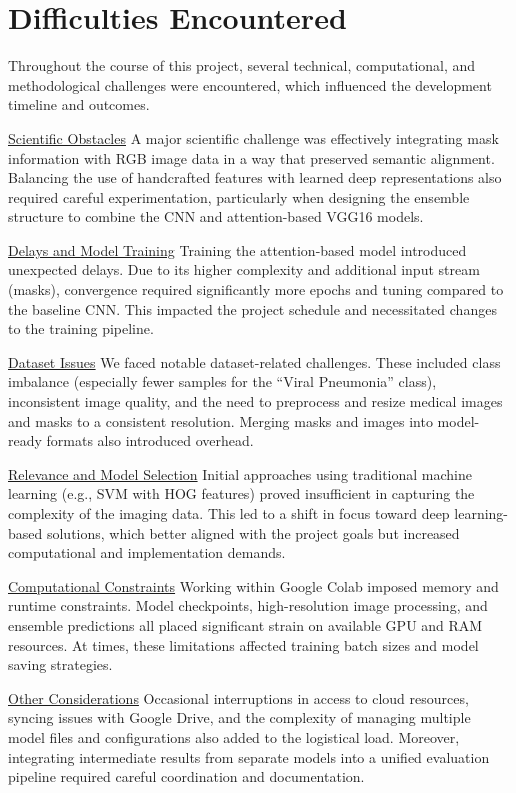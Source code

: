 \documentclass{article}
\begin{document}
\newpage

\section{Difficulties Encountered}

Throughout the course of this project, several technical, computational, and methodological challenges were encountered, which influenced the development timeline and outcomes.

\underline{Scientific Obstacles}
A major scientific challenge was effectively integrating mask information with RGB image data in a way that preserved semantic alignment. Balancing the use of handcrafted features with learned deep representations also required careful experimentation, particularly when designing the ensemble structure to combine the CNN and attention-based VGG16 models.

\underline{Delays and Model Training}
Training the attention-based model introduced unexpected delays. Due to its higher complexity and additional input stream (masks), convergence required significantly more epochs and tuning compared to the baseline CNN. This impacted the project schedule and necessitated changes to the training pipeline.

\underline{Dataset Issues}
We faced notable dataset-related challenges. These included class imbalance (especially fewer samples for the “Viral Pneumonia” class), inconsistent image quality, and the need to preprocess and resize medical images and masks to a consistent resolution. Merging masks and images into model-ready formats also introduced overhead.

\underline{Relevance and Model Selection}
Initial approaches using traditional machine learning (e.g., SVM with HOG features) proved insufficient in capturing the complexity of the imaging data. This led to a shift in focus toward deep learning-based solutions, which better aligned with the project goals but increased computational and implementation demands.

\underline{Computational Constraints}
Working within Google Colab imposed memory and runtime constraints. Model checkpoints, high-resolution image processing, and ensemble predictions all placed significant strain on available GPU and RAM resources. At times, these limitations affected training batch sizes and model saving strategies.

\underline{Other Considerations}
Occasional interruptions in access to cloud resources, syncing issues with Google Drive, and the complexity of managing multiple model files and configurations also added to the logistical load. Moreover, integrating intermediate results from separate models into a unified evaluation pipeline required careful coordination and documentation.
\end{document}
